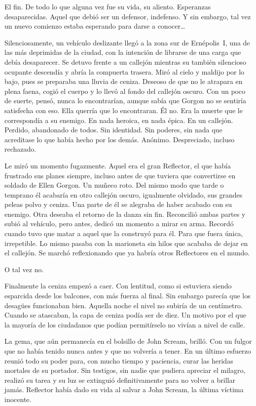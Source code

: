 El fin. De todo lo que alguna vez fue su vida, su aliento. Esperanzas desaparecidas. Aquel que debió ser un defensor, indefenso. Y sin embargo, tal vez un nuevo comienzo estaba esperando para darse a conocer\dots

\fancyparbreak
Silenciosamente, un vehículo deslizante llegó a la zona sur de Ernépolis~I, una de las más deprimidas de la ciudad, con la intención de librarse de una carga que debía desaparecer. Se detuvo frente a un callejón mientras su también silencioso ocupante descendía y abría la compuerta trasera. Miró al cielo y maldijo por lo bajo, pues se preparaba una lluvia de ceniza. Deseoso de que no le atrapara en plena faena, cogió el cuerpo y lo llevó al fondo del callejón oscuro. Con un poco de suerte, pensó, nunca lo encontrarían, aunque sabía que Gorgon no se sentiría satisfecha con eso. Ella querría que lo encontraran. Él no. Era la muerte que le correspondía a su enemigo. En nada heroica, en nada épica. En un callejón. Perdido, abandonado de todos. Sin identidad. Sin poderes, sin nada que acreditase lo que había hecho por los demás. Anónimo. Despreciado, incluso rechazado.

Le miró un momento fugazmente. Aquel era el gran Reflector, el que había frustrado sus planes siempre, incluso antes de que tuviera que convertirse en soldado de Ellen Gorgon. Un muñeco roto. Del mismo modo que tarde o temprano él acabaría en otro callejón oscuro, igualmente olvidado, sus grandes peleas polvo y ceniza. Una parte de él se alegraba de haber acabado con su enemigo. Otra deseaba el retorno de la danza sin fin. Reconcilió ambas partes y subió al vehículo, pero antes, dedicó un momento a mirar su arma. Recordó cuando tuvo que matar a aquel que la construyó para él. Para que fuera única, irrepetible. Lo mismo pasaba con la marioneta sin hilos que acababa de dejar en el callejón. Se marchó reflexionando que ya habría otros Reflectores en el mundo.

O tal vez no.

Finalmente la ceniza empezó a caer. Con lentitud, como si estuviera siendo esparcida desde los balcones, con más fuerza al final. Sin embargo parecía que los desagües funcionaban bien. Aquella noche el nivel no subiría de un centímetro. Cuando se atascaban, la capa de ceniza podía ser de diez. Un motivo por el que la mayoría de los ciudadanos que podían permitírselo no vivían a nivel de calle.

La gema, que aún permanecía en el bolsillo de John Scream, brilló. Con un fulgor que no había tenido nunca antes y que no volvería a tener. En un último esfuerzo reunió todo su poder para, con mucho tiempo y paciencia, curar las heridas mortales de su portador. Sin testigos, sin nadie que pudiera apreciar el milagro, realizó su tarea y su luz se extinguió definitivamente para no volver a brillar jamás. Reflector había dado su vida al salvar a John Scream, la última víctima inocente.


